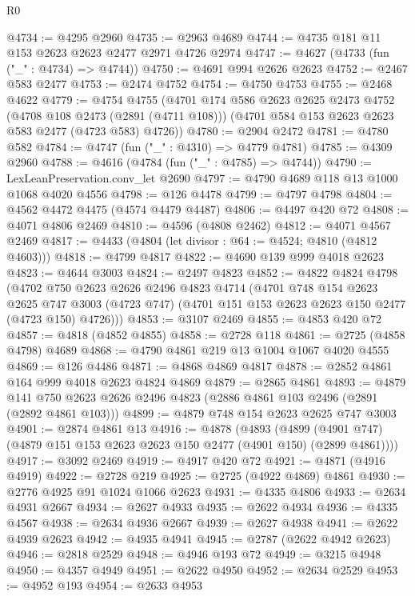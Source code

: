 \begin{lexlean}{R0}
\begin{coremodule}
@4734 := @4295 @2960
@4735 := @2963 @4689
@4744 := @4735 @181 @11 @153 @2623 @2623 @2477 @2971 @4726 @2974
@4747 := @4627 (@4733 (fun ("_" : @4734) => @4744))
@4750 := @4691 @994 @2626 @2623
@4752 := @2467 @583 @2477
@4753 := @2474 @4752
@4754 := @4750 @4753
@4755 := @2468 @4622
@4779 := @4754
    @4755
    (@4701
      @174
      @586
      @2623
      @2625
      @2473
      @4752
      (@4708 @108 @2473 (@2891 (@4711 @108)))
      (@4701 @584 @153 @2623 @2623 @583 @2477 (@4723 @583) @4726))
@4780 := @2904 @2472
@4781 := @4780 @582
@4784 := @4747 (fun ("_" : @4310) => @4779 @4781)
@4785 := @4309 @2960
@4788 := @4616 (@4784 (fun ("_" : @4785) => @4744))
@4790 := LexLeanPreservation.conv_let @2690
@4797 := @4790 @4689 @118 @13 @1000 @1068 @4020 @4556
@4798 := @126 @4478
@4799 := @4797 @4798
@4804 := @4562 @4472 @4475 (@4574 @4479 @4487)
@4806 := @4497 @420 @72
@4808 := @4071 @4806 @2469
@4810 := @4596 (@4808 @2462)
@4812 := @4071 @4567 @2469
@4817 := @4433 (@4804 (let divisor : @64 := @4524; @4810 (@4812 @4603)))
@4818 := @4799 @4817
@4822 := @4690 @139 @999 @4018 @2623
@4823 := @4644 @3003
@4824 := @2497 @4823
@4852 := @4822
    @4824
    @4798
    (@4702
      @750
      @2623
      @2626
      @2496
      @4823
      @4714
      (@4701
        @748
        @154
        @2623
        @2625
        @747
        @3003
        (@4723 @747)
        (@4701 @151 @153 @2623 @2623 @150 @2477 (@4723 @150) @4726)))
@4853 := @3107 @2469
@4855 := @4853 @420 @72
@4857 := @4818 (@4852 @4855)
@4858 := @2728 @118
@4861 := @2725 (@4858 @4798) @4689
@4868 := @4790 @4861 @219 @13 @1004 @1067 @4020 @4555
@4869 := @126 @4486
@4871 := @4868 @4869 @4817
@4878 := @2852 @4861 @164 @999 @4018 @2623 @4824 @4869
@4879 := @2865 @4861
@4893 := @4879 @141 @750 @2623 @2626 @2496 @4823 (@2886 @4861 @103 @2496 (@2891 (@2892 @4861 @103)))
@4899 := @4879 @748 @154 @2623 @2625 @747 @3003
@4901 := @2874 @4861 @13
@4916 := @4878
    (@4893 (@4899 (@4901 @747) (@4879 @151 @153 @2623 @2623 @150 @2477 (@4901 @150) (@2899 @4861))))
@4917 := @3092 @2469
@4919 := @4917 @420 @72
@4921 := @4871 (@4916 @4919)
@4922 := @2728 @219
@4925 := @2725 (@4922 @4869) @4861
@4930 := @2776 @4925 @91 @1024 @1066 @2623
@4931 := @4335 @4806
@4933 := @2634 @4931 @2667
@4934 := @2627 @4933
@4935 := @2622 @4934
@4936 := @4335 @4567
@4938 := @2634 @4936 @2667
@4939 := @2627 @4938
@4941 := @2622 @4939 @2623
@4942 := @4935 @4941
@4945 := @2787 (@2622 @4942 @2623)
@4946 := @2818 @2529
@4948 := @4946 @193 @72
@4949 := @3215 @4948
@4950 := @4357 @4949
@4951 := @2622 @4950
@4952 := @2634 @2529
@4953 := @4952 @193
@4954 := @2633 @4953

\end{coremodule}
\end{lexlean}
